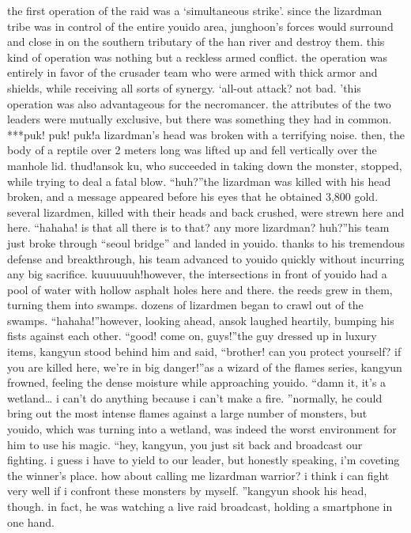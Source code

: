 the first operation of the raid was a ‘simultaneous strike’.
 since the lizardman tribe was in control of the entire youido area, junghoon’s forces would surround and close in on the southern tributary of the han river and destroy them.
this kind of operation was nothing but a reckless armed conflict.
 the operation was entirely in favor of the crusader team who were armed with thick armor and shields, while receiving all sorts of synergy.
‘all-out attack? not bad.
’this operation was also advantageous for the necromancer.
 the attributes of the two leaders were mutually exclusive, but there was something they had in common.
***puk! puk! puk!a lizardman’s head was broken with a terrifying noise.
 then, the body of a reptile over 2 meters long was lifted up and fell vertically over the manhole lid.
thud!ansok ku, who succeeded in taking down the monster, stopped, while trying to deal a fatal blow.
“huh?”the lizardman was killed with his head broken, and a message appeared before his eyes that he obtained 3,800 gold.
 several lizardmen, killed with their heads and back crushed, were strewn here and here.
“hahaha! is that all there is to that? any more lizardman? huh?”his team just broke through “seoul bridge” and landed in youido.
 thanks to his tremendous defense and breakthrough, his team advanced to youido quickly without incurring any big sacrifice.
kuuuuuuh!however, the intersections in front of youido had a pool of water with hollow asphalt holes here and there.
 the reeds grew in them, turning them into swamps.
 dozens of lizardmen began to crawl out of the swamps.
“hahaha!”however, looking ahead, ansok laughed heartily, bumping his fists against each other.
“good! come on, guys!”the guy dressed up in luxury items, kangyun stood behind him and said, “brother! can you protect yourself? if you are killed here, we’re in big danger!”as a wizard of the flames series, kangyun frowned, feeling the dense moisture while approaching youido.
“damn it, it’s a wetland… i can’t do anything because i can’t make a fire.
”normally, he could bring out the most intense flames against a large number of monsters, but youido, which was turning into a wetland, was indeed the worst environment for him to use his magic.
“hey, kangyun, you just sit back and broadcast our fighting.
 i guess i have to yield to our leader, but honestly speaking, i’m coveting the winner’s place.
 how about calling me lizardman warrior? i think i can fight very well if i confront these monsters by myself.
”kangyun shook his head, though.
 in fact, he was watching a live raid broadcast, holding a smartphone in one hand.


